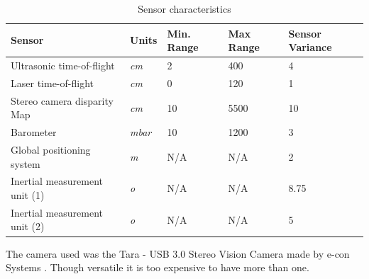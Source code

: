 \begin{table}[ht]
\centering
\begin{tabular}{@{}lllll@{}}
\toprule
\textbf{Sensor}             & \textbf{Units} & \textbf{Min. Range} & \textbf{Max Range} & \textbf{Sensor Variance} \\ \midrule
Ultrasonic time-of-flight \cite{HCSR04datasheet}   & \textit{cm}    & 2                   & 400                & 4                        \\
Laser time-of-flight \cite{VL53L0Xdatasheet}       & \textit{cm}    & 0                   & 120                & 1                        \\
Stereo camera disparity Map & \textit{cm}    & 10                  & 5500               & 10                       \\
Barometer \cite{MS5611datasheet}                  & \textit{mbar}  & 10                  & 1200               & 3                        \\
Global positioning system \cite{NEO6Mdatasheet}   & \textit{m}     & N/A                 & N/A   & 2                       \\ 
Inertial measurement unit (1) \cite{L3GD20datasheet}   & \textit{o}   & N/A                 & N/A                & 8.75                     \\
Inertial measurement unit (2) \cite{MPU9250datasheet}   & \textit{o}   & N/A                 & N/A                & 5                     \\ \bottomrule
\end{tabular}
\caption{Sensor characteristics}
\label{tab:sensors}
\end{table}

The camera used was the Tara - USB 3.0 Stereo Vision Camera made by e-con Systems \cite{econ2016tara}. Though versatile it is too expensive to have more than one.







